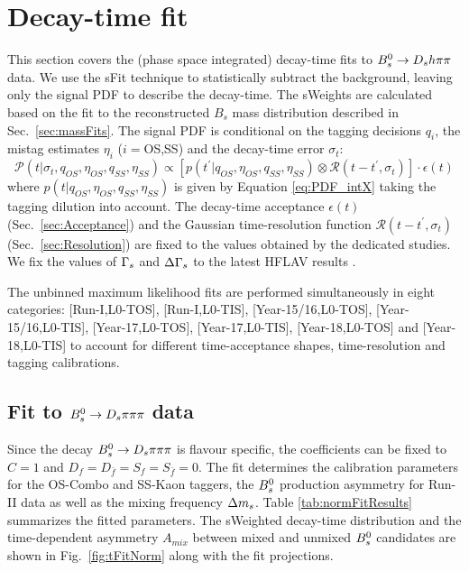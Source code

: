\section{Decay-time fit}
\label{sec:timeFit}

This section covers the (phase space integrated) decay-time fits to ${{B}^0_{s}}\rightarrow{\ensuremath{{D}_{s}}}{\ensuremath{h}}{\ensuremath{\pi}}{\ensuremath{\pi}}$ data.
We use the \textsf{sFit} technique \cite{Pivk:2004ty} to statistically subtract the background, leaving only the signal PDF to describe the decay-time. 
The \textsf{sWeights} are calculated based on the fit to the reconstructed $B_s$ mass distribution described in Sec.~\ref{sec:massFits}.
The signal PDF is conditional on the tagging decisions $q_i$, the mistag estimates $\eta_i$ ($i=$OS,SS) and the decay-time error $\sigma_t$:
\begin{equation}
\label{eq:TPDF_full}
\mathcal{P}(t \vert \sigma_t, q_{OS}, \eta_{OS}, q_{SS}, \eta_{SS}) \propto \left[ p(t^{'} \vert q_{OS}, \eta_{OS}, q_{SS}, \eta_{SS})  \otimes \mathcal{R}(t - t^{'},\sigma_t) \right] \cdot \epsilon(t)
\end{equation}
where $p(t \vert q_{OS}, \eta_{OS}, q_{SS}, \eta_{SS})$ is given by Equation \ref{eq:PDF_intX} taking the tagging dilution into account.
The decay-time acceptance $\epsilon(t)$ (Sec.~\ref{sec:Acceptance}) and the Gaussian time-resolution function $\mathcal{R}(t - t^{'},\sigma_t)$ (Sec.~\ref{sec:Resolution}) are fixed to the values obtained by the dedicated studies. 
We fix the values of ${\Gamma_{{s}}}$ and ${\Delta\Gamma_{{s}}}$ to the latest HFLAV results \cite{HFAG}.

The  unbinned maximum likelihood fits are performed simultaneously in eight categories: 
[Run-I,\textsf{L0-TOS}], [Run-I,\textsf{L0-TIS}], %
 [Year-15/16,\textsf{L0-TOS}], [Year-15/16,\textsf{L0-TIS}],
 [Year-17,\textsf{L0-TOS}], [Year-17,\textsf{L0-TIS}],
  [Year-18,\textsf{L0-TOS}] and [Year-18,\textsf{L0-TIS}]
 to account for different time-acceptance shapes, time-resolution and tagging calibrations. 
 
 
\subsection{Fit to ${{B}^0_{s}}\rightarrow{\ensuremath{{D}_{s}}}{\ensuremath{\pi}}{\ensuremath{\pi}}{\ensuremath{\pi}}$ data}  
\label{ssec:timeNormFit}

Since the decay ${{B}^0_{s}}\rightarrow{\ensuremath{{D}_{s}}}{\ensuremath{\pi}}{\ensuremath{\pi}}{\ensuremath{\pi}}$ is flavour specific, the \CP coefficients can be fixed to $C=1$ and $D_{f} = D_{\bar{f}} = S_{f} = S_{\bar{f}} = 0$.
The fit determines the calibration parameters for the OS-Combo and SS-Kaon taggers, the ${{B}^0_{s}}$ production asymmetry for Run-II data as well as the mixing frequency ${\Delta m_{{s}}}$. 
Table \ref{tab:normFitResults} summarizes the fitted parameters. 
The \textsf{sWeighted} decay-time distribution and  the
time-dependent asymmetry $A_{mix}$ between mixed and unmixed ${{B}^0_{s}}$ candidates
are shown in Fig.~\ref{fig:tFitNorm} along with the fit projections.

